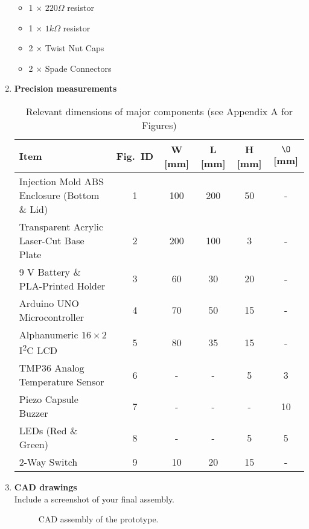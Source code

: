 \documentclass[10pt]{article}
\begin{document}
\begin{enumerate}
\begin{multicols}{2}
\begin{itemize}
			      \item 1 $\times$ $220 \Omega$ resistor
			      \item 1 $\times$ $1 k\Omega$ resistor
			      \item 2 $\times$ Twist Nut Caps
			      \item 2 $\times$ Spade Connectors
		      \end{itemize}
	      \end{multicols}
	\item \textbf{Precision measurements}
	      \begin{table}[H]
		      \centering
		      \caption{Relevant dimensions of major components (see Appendix A for Figures)}
		      \label{tab:dim_condensed}
		      \begin{tabular}{l c c c c c}
			      \toprule
			      Item                                               & Fig.\ ID & W [mm] & L [mm] & H [mm] & $\O$ [mm] \\
			      \midrule
			      Injection Mold ABS Enclosure (Bottom \& Lid)       & 1        & 100    & 200    & 50     & -         \\
			      Transparent Acrylic Laser-Cut Base Plate           & 2        & 200    & 100    & 3      & -         \\
			      9 V Battery \& PLA-Printed Holder                  & 3        & 60     & 30     & 20     & -         \\
			      Arduino UNO Microcontroller                        & 4        & 70     & 50     & 15     & -         \\
			      Alphanumeric $16\times2$ I\textsuperscript{2}C LCD & 5        & 80     & 35     & 15     & -         \\
			      TMP36 Analog Temperature Sensor                    & 6        & -      & -      & 5      & 3         \\
			      Piezo Capsule Buzzer                               & 7        & -      & -      & -      & 10        \\
			      LEDs (Red \& Green)                                & 8        & -      & -      & 5      & 5         \\
			      2-Way Switch                                       & 9        & 10     & 20     & 15     & -         \\
			      \bottomrule
		      \end{tabular}
	      \end{table}
	\item \textbf{CAD drawings}\\ Include a screenshot of your final assembly.
	      \begin{figure}[H] \centering
		      \caption{CAD assembly of the prototype.} \end{figure}


\end{enumerate}
\end{document}
